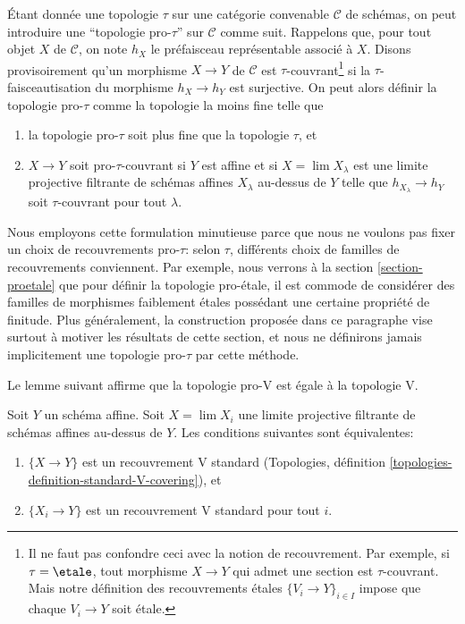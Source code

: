 \medskip\noindent
Étant donnée une topologie $\tau$ sur une catégorie convenable $\mathcal{C}$
de schémas, on peut introduire une ``topologie pro-$\tau$''
sur $\mathcal{C}$ comme suit. Rappelons que, pour tout objet $X$ de $\mathcal{C}$,
on note $h_X$ le préfaisceau représentable associé à $X$.
Disons provisoirement qu'un morphisme $X \to Y$ de $\mathcal{C}$
est $\tau$-couvrant\footnote{Il ne faut pas confondre ceci avec
la notion de recouvrement. Par exemple, si $\tau = \etale$,
tout morphisme $X \to Y$ qui admet une section est $\tau$-couvrant. Mais notre
définition des recouvrements \'etales $\{V_i \to Y\}_{i \in I}$
impose que chaque $V_i \to Y$ soit \'etale.}
si la $\tau$-faisceautisation du morphisme $h_X \to h_Y$
est surjective. On peut alors définir la topologie pro-$\tau$
comme la topologie la moins fine telle que
\begin{enumerate}
\item la topologie pro-$\tau$ soit plus fine que la topologie $\tau$, et
\item $X \to Y$ soit pro-$\tau$-couvrant si
$Y$ est affine et si $X = \lim X_\lambda$ est une limite projective
filtrante de schémas affines $X_\lambda$ au-dessus de $Y$ telle que
$h_{X_\lambda} \to h_Y$ soit $\tau$-couvrant pour tout $\lambda$.
\end{enumerate}
Nous employons cette formulation minutieuse parce que nous ne voulons pas
fixer un choix de recouvrements pro-$\tau$: selon $\tau$,
différents choix de familles de recouvrements conviennent.
Par exemple, nous verrons à la section \ref{section-proetale} que
pour définir la topologie pro-\'etale, il est commode de considérer des familles
de morphismes faiblement \'etales possédant une certaine propriété de finitude.
Plus généralement, la construction proposée dans ce paragraphe
vise surtout à motiver les résultats de cette section, et nous ne définirons jamais
implicitement une topologie pro-$\tau$ par cette méthode.

\medskip\noindent
Le lemme suivant affirme que la
topologie pro-V est égale à la topologie V.

\begin{lemma}
\label{lemma-pro-V-V}
Soit $Y$ un schéma affine. Soit $X = \lim X_i$ une limite projective filtrante
de schémas affines au-dessus de $Y$. Les conditions suivantes sont équivalentes:
\begin{enumerate}
\item $\{X \to Y\}$ est un recouvrement V standard
(Topologies, définition \ref{topologies-definition-standard-V-covering}), et
\item $\{X_i \to Y\}$ est un recouvrement V standard pour tout $i$.
\end{enumerate}
\end{lemma}

